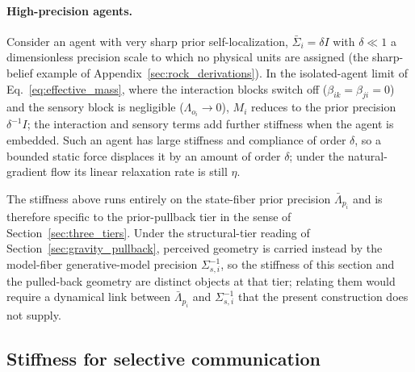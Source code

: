 \paragraph{High-precision agents.} Consider an agent with very sharp prior self-localization, $\bar{\Sigma}_i = \delta I$ with $\delta \ll 1$ a dimensionless precision scale to which no physical units are assigned (the sharp-belief example of Appendix~\ref{sec:rock_derivations}). In the isolated-agent limit of Eq.~\eqref{eq:effective_mass}, where the interaction blocks switch off ($\beta_{ik} = \beta_{ji} = 0$) and the sensory block is negligible ($\Lambda_{o_i} \to 0$), $M_i$ reduces to the prior precision $\delta^{-1}I$; the interaction and sensory terms add further stiffness when the agent is embedded. Such an agent has large stiffness and compliance of order $\delta$, so a bounded static force displaces it by an amount of order $\delta$; under the natural-gradient flow its linear relaxation rate is still $\eta$.

The stiffness above runs entirely on the state-fiber prior precision $\bar{\Lambda}_{p_i}$ and is therefore specific to the prior-pullback tier in the sense of Section~\ref{sec:three_tiers}. Under the structural-tier reading of Section~\ref{sec:gravity_pullback}, perceived geometry is carried instead by the model-fiber generative-model precision $\Sigma_{s,i}^{-1}$, so the stiffness of this section and the pulled-back geometry are distinct objects at that tier; relating them would require a dynamical link between $\bar{\Lambda}_{p_i}$ and $\Sigma_{s,i}^{-1}$ that the present construction does not supply.

\subsection{Stiffness for selective communication}
\label{sec:selective_stiffness}

